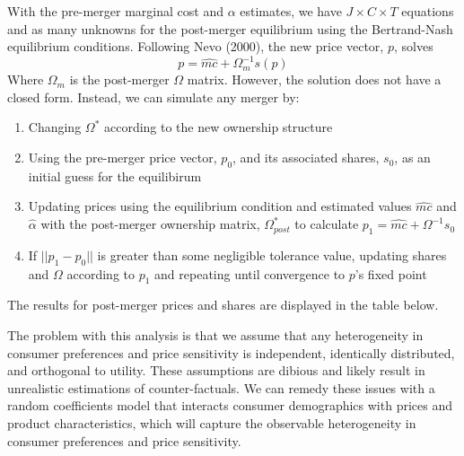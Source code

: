 \documentclass{article}
\newcommand{\ahat}{\hat{\alpha}}
\begin{document}
With the pre-merger marginal cost and $\alpha$ estimates, we have $J\times C\times T$ equations and as many unknowns for the post-merger equilibrium using the Bertrand-Nash equilibrium conditions. Following Nevo (2000), the new price vector, $p$, solves \[ 
        p = \hat{mc} + \Omega_{m}^{-1}s(p)
\]
Where $\Omega_m$ is the post-merger $\Omega$ matrix. 
However, the solution does not have a closed form. Instead, we can simulate any merger by:
\begin{enumerate}
        \item Changing $\Omega^*$ according to the new ownership structure
        \item Using the pre-merger price vector, $p_0$, and its associated shares, $s_0$, as an initial guess for the equilibirum
        \item Updating prices using the equilibrium condition and estimated values $\hat{mc}$ and $\ahat$ with the post-merger ownership matrix, $\Omega^*_{post}$ to calculate ${p_1 = \hat{mc} + \Omega^{-1}s_0}$
        \item If $||p_1-p_0||$ is greater than some negligible tolerance value, updating shares and $\Omega$ according to $p_1$ and repeating until convergence to $p$'s fixed point
\end{enumerate}
The results for post-merger prices and shares are displayed in the table below.
\begin{center}
        
\end{center}
The problem with this analysis is that we assume that any heterogeneity in consumer preferences and price sensitivity is independent, identically distributed, and orthogonal to utility. These assumptions are dibious and likely result in unrealistic estimations of counter-factuals. We can remedy these issues with a random coefficients model that interacts consumer demographics with prices and product characteristics, which will capture the observable heterogeneity in consumer preferences and price sensitivity.

\end{document}
